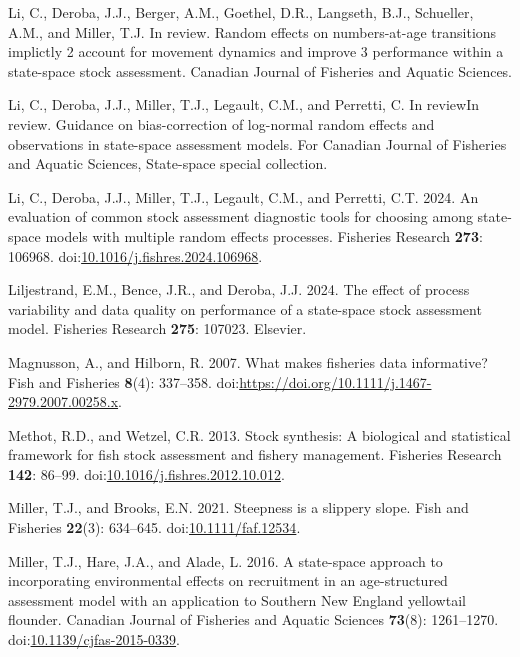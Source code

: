 \documentclass[
  12pt,
]{article}
\newlength{\cslhangindent}
\newlength{\cslentryspacingunit} %
\newenvironment{CSLReferences}[2] %
 {%
  \setlength{\parindent}{0pt}
  \ifodd #1
  \let\oldpar\par
  \def\par{\hangindent=\cslhangindent\oldpar}
  \fi
  \setlength{\parskip}{#2\cslentryspacingunit}
 }%
 {}
\begin{document}
\begin{CSLReferences}{1}{0}
\leavevmode{}%
Li, C., Deroba, J.J., Berger, A.M., Goethel, D.R., Langseth, B.J.,
Schueller, A.M., and Miller, T.J. In review. Random effects on
numbers-at-age transitions implictly 2 account for movement dynamics and
improve 3 performance within a state-space stock assessment. Canadian
Journal of Fisheries and Aquatic Sciences.

\leavevmode{}%
Li, C., Deroba, J.J., Miller, T.J., Legault, C.M., and Perretti, C. In
reviewIn review. Guidance on bias-correction of log-normal random
effects and observations in state-space assessment models. For Canadian
Journal of Fisheries and Aquatic Sciences, State-space special
collection.

\leavevmode{}%
Li, C., Deroba, J.J., Miller, T.J., Legault, C.M., and Perretti, C.T.
2024. An evaluation of common stock assessment diagnostic tools for
choosing among state-space models with multiple random effects
processes. Fisheries Research \textbf{273}: 106968.
doi:\href{https://doi.org/10.1016/j.fishres.2024.106968}{10.1016/j.fishres.2024.106968}.

\leavevmode{}%
Liljestrand, E.M., Bence, J.R., and Deroba, J.J. 2024. The effect of
process variability and data quality on performance of a state-space
stock assessment model. Fisheries Research \textbf{275}: 107023.
Elsevier.

\leavevmode{}%
Magnusson, A., and Hilborn, R. 2007. What makes fisheries data
informative? Fish and Fisheries \textbf{8}(4): 337--358.
doi:\url{https://doi.org/10.1111/j.1467-2979.2007.00258.x}.

\leavevmode{}%
Methot, R.D., and Wetzel, C.R. 2013. Stock synthesis: A biological and
statistical framework for fish stock assessment and fishery management.
Fisheries Research \textbf{142}: 86--99.
doi:\href{https://doi.org/10.1016/j.fishres.2012.10.012}{10.1016/j.fishres.2012.10.012}.

\leavevmode{}%
Miller, T.J., and Brooks, E.N. 2021. Steepness is a slippery slope. Fish
and Fisheries \textbf{22}(3): 634--645.
doi:\href{https://doi.org/10.1111/faf.12534}{10.1111/faf.12534}.

\leavevmode{}%
Miller, T.J., Hare, J.A., and Alade, L. 2016. A state-space approach to
incorporating environmental effects on recruitment in an age-structured
assessment model with an application to {S}outhern {N}ew {E}ngland
yellowtail flounder. Canadian Journal of Fisheries and Aquatic Sciences
\textbf{73}(8): 1261--1270.
doi:\href{https://doi.org/10.1139/cjfas-2015-0339}{10.1139/cjfas-2015-0339}.


\end{CSLReferences}
\end{document}
